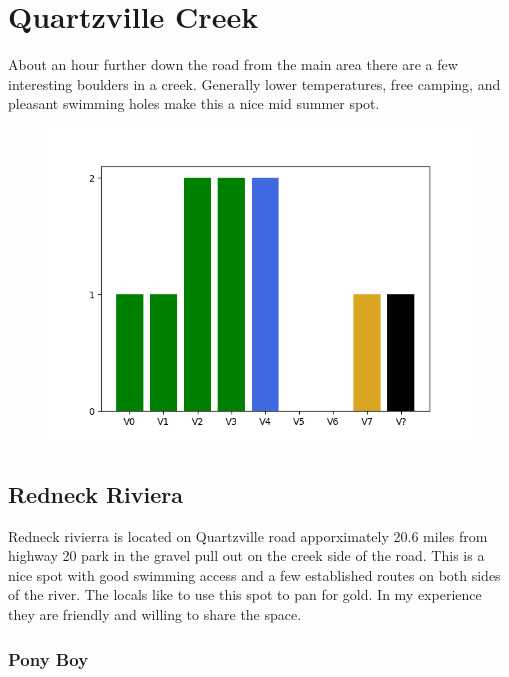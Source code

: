 \chapter{Quartzville Creek}\label{a:Quartzville Creek}
\lhead{\textcolor{\chapterColor}{\rule[-2pt]{\textwidth}{15pt}}}
About an hour further down the road from the main area there are a few interesting boulders in a creek. Generally lower temperatures, free camping, and pleasant swimming holes make this a nice mid summer spot.
\begin{figure}[h]
  \centering
    \includegraphics[width=\linewidth]{./maps/plots/Quartzville Creek.png}
\end{figure}

\section{Redneck Riviera}\label{sa:Redneck Riviera}
Redneck rivierra is located on Quartzville road apporximately 20.6 miles from highway 20 park in the gravel pull out on the creek side of the road. This is a nice spot with good swimming access and a few established routes on both sides of the river. The locals like to use this spot to pan for gold. In my experience they are friendly and willing to share the space.
\subsection*{Pony Boy}\label{bf:Pony Boy}
\

